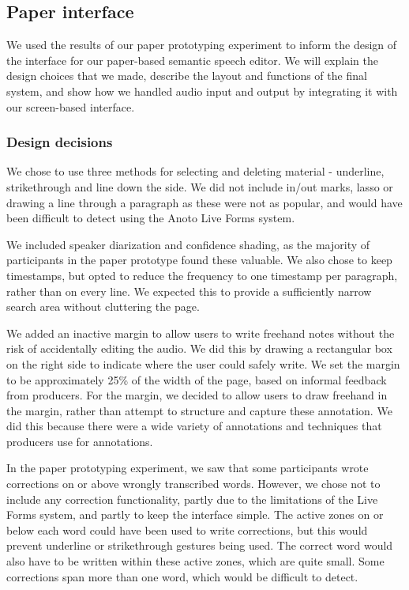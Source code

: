 \subsection{Paper interface}

We used the results of our paper prototyping experiment to inform the design of the interface for our paper-based
semantic speech editor. We will explain the design choices that we made, describe the layout and functions of the final
system, and show how we handled audio input and output by integrating it with our screen-based interface.

\subsubsection{Design decisions}

We chose to use three methods for selecting and deleting material - underline, strikethrough and line down the side.
We did not include in/out marks, lasso or drawing a line through a paragraph as these were not as popular, and would
have been difficult to detect using the Anoto Live Forms system.

We included speaker diarization and confidence shading, as the majority of participants in the paper prototype found
these valuable. We also chose to keep timestamps, but opted to reduce the frequency to one timestamp per paragraph,
rather than on every line. We expected this to provide a sufficiently narrow search area without cluttering the page.

We added an inactive margin to allow users to write freehand notes without the risk of accidentally editing the audio.
We did this by drawing a rectangular box on the right side to indicate where the user could safely write.  We set the
margin to be approximately 25\% of the width of the page, based on informal feedback from producers.  For the margin,
we decided to allow users to draw freehand in the margin, rather than attempt to structure and capture these
annotation. We did this because there were a wide variety of annotations and techniques that producers use for
annotations.

In the paper prototyping experiment, we saw that some participants wrote corrections on or above wrongly transcribed
words. However, we chose not to include any correction functionality, partly due to the limitations of the Live Forms
system, and partly to keep the interface simple. The active zones on or below each word could have been used to write
corrections, but this would prevent underline or strikethrough gestures being used. The correct word would also have to
be written within these active zones, which are quite small. Some corrections span more than one word, which would be
difficult to detect.

